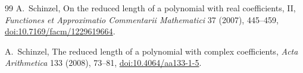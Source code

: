 \documentclass[11pt]{article}
\begin{document}
\begin{thebibliography}{99}
A.~Schinzel,
\newblock On the reduced length of a polynomial with real coefficients, II,
\newblock \emph{Functiones et Approximatio Commentarii Mathematici} 37
(2007), 445--459,
\newblock \href{https://doi.org/10.7169/facm/1229619664}
{doi:10.7169/facm/1229619664}.

A.~Schinzel,
\newblock The reduced length of a polynomial with complex coefficients,
\newblock \emph{Acta Arithmetica} 133 (2008), 73--81,
\newblock \href{https://doi.org/10.4064/aa133-1-5}
{doi:10.4064/aa133-1-5}.
\end{thebibliography}
\end{document}
